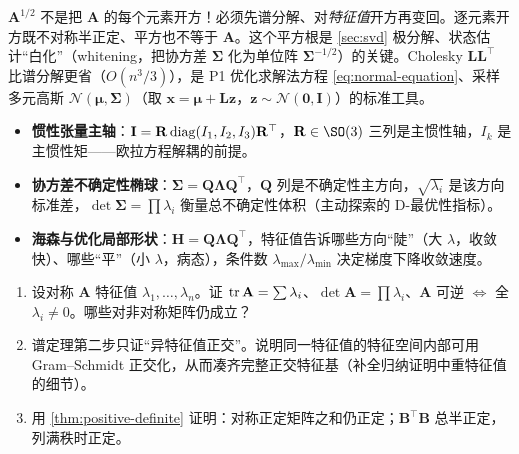 \begin{pitfall}
$\mathbf{A}^{1/2}$ 不是把 $\mathbf{A}$ 的每个元素开方！必须先谱分解、对\emph{特征值}开方再变回。逐元素开方既不对称半正定、平方也不等于 $\mathbf{A}$。这个平方根是 \cref{sec:svd} 极分解、状态估计“白化”（whitening，把协方差 $\boldsymbol{\Sigma}$ 化为单位阵 $\boldsymbol{\Sigma}^{-1/2}$）的关键。Cholesky $\mathbf{L}\mathbf{L}^\top$ 比谱分解更省（$O(n^3/3)$），是 P1 优化求解法方程 \cref{eq:normal-equation}、采样多元高斯 $\mathcal{N}(\boldsymbol{\mu},\boldsymbol{\Sigma})$（取 $\mathbf{x}=\boldsymbol{\mu}+\mathbf{L}\mathbf{z}$，$\mathbf{z}\sim\mathcal{N}(\mathbf{0},\mathbf{I})$）的标准工具。
\end{pitfall}

\begin{example}\label{ex:spectral-robot}
\begin{itemize}
  \item \textbf{惯性张量主轴}：$\mathbf{I}=\mathbf{R}\operatorname{diag}(I_1,I_2,I_3)\mathbf{R}^\top$，$\mathbf{R}\in\SO(3)$ 三列是主惯性轴，$I_k$ 是主惯性矩——欧拉方程解耦的前提。
  \item \textbf{协方差不确定性椭球}：$\boldsymbol{\Sigma}=\mathbf{Q}\boldsymbol{\Lambda}\mathbf{Q}^\top$，$\mathbf{Q}$ 列是不确定性主方向，$\sqrt{\lambda_i}$ 是该方向标准差，$\det\boldsymbol{\Sigma}=\prod\lambda_i$ 衡量总不确定性体积（主动探索的 D-最优性指标）。
  \item \textbf{海森与优化局部形状}：$\mathbf{H}=\mathbf{Q}\boldsymbol{\Lambda}\mathbf{Q}^\top$，特征值告诉哪些方向“陡”（大 $\lambda$，收敛快）、哪些“平”（小 $\lambda$，病态），条件数 $\lambda_{\max}/\lambda_{\min}$ 决定梯度下降收敛速度。
\end{itemize}
\end{example}

\begin{practice}
\begin{enumerate}
  \item 设对称 $\mathbf{A}$ 特征值 $\lambda_1,\dots,\lambda_n$。证 $\operatorname{tr}\mathbf{A}=\sum\lambda_i$、$\det\mathbf{A}=\prod\lambda_i$、$\mathbf{A}$ 可逆 $\iff$ 全 $\lambda_i\neq0$。哪些对非对称矩阵仍成立？
  \item 谱定理第二步只证“异特征值正交”。说明同一特征值的特征空间内部可用 Gram--Schmidt 正交化，从而凑齐完整正交特征基（补全归纳证明中重特征值的细节）。
  \item 用 \cref{thm:positive-definite} 证明：对称正定矩阵之和仍正定；$\mathbf{B}^\top\mathbf{B}$ 总半正定，列满秩时正定。
\end{enumerate}
\end{practice}

